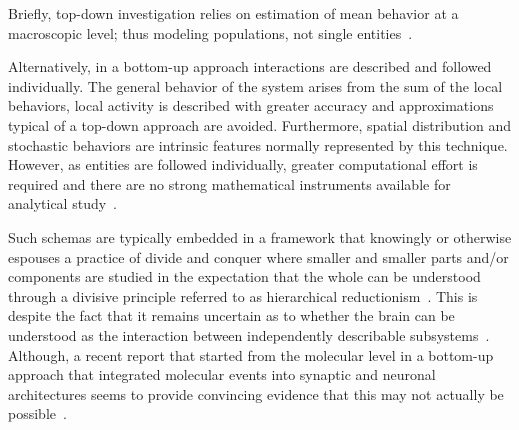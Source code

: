 \documentclass[10pt,letterpaper]{article}
\begin{document}
Briefly, top-down investigation relies on estimation of mean behavior at a macroscopic level; thus modeling populations, not single entities~\cite{chiacchio14}.

Alternatively, in a bottom-up approach interactions are described and followed individually. The general behavior of the system arises from the sum of the local behaviors, local activity is described with greater accuracy and approximations typical of a top-down approach are avoided. Furthermore, spatial distribution and stochastic behaviors are intrinsic features normally represented by this technique. However, as entities are followed individually, greater computational effort is required and there are no strong mathematical instruments available for analytical study~\cite{chiacchio14}.

Such schemas are typically embedded in a framework that knowingly or otherwise espouses a practice of divide and conquer where smaller and smaller parts and/or components are studied in the expectation that the whole can be understood through a divisive principle referred to as hierarchical reductionism~\cite{dawkins06}. This is despite the fact that it remains uncertain as to whether the brain can be understood as the interaction between independently describable subsystems~\cite{djurfeldt08}. Although, a recent report that started from the molecular level in a bottom-up approach that integrated molecular events into synaptic and neuronal architectures seems to provide convincing evidence that this may not actually be possible~\cite{bouteiller11}.

\end{document}
